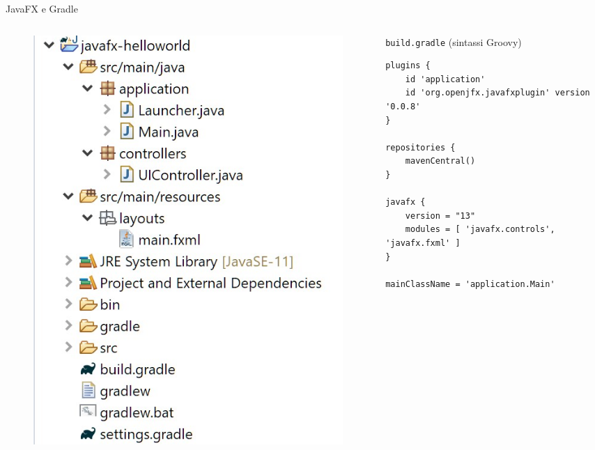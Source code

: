 \documentclass[presentation]{beamer}
\begin{document}
\begin{frame}[fragile]{JavaFX e Gradle}
\begin{columns}[t]
\begin{column}{0.3\textwidth}
\begin{figure}
\includegraphics[width=\textwidth]{img/javafx-gradle-project.png}
\end{figure}
\end{column}
\begin{column}{0.7\textwidth}
\begin{block}{\texttt{build.gradle} (sintassi Groovy)}

\begin{lstlisting}[basicstyle=\tiny]
plugins {
    id 'application'
    id 'org.openjfx.javafxplugin' version '0.0.8'
}

repositories {
    mavenCentral()
}

javafx {
    version = "13"
    modules = [ 'javafx.controls', 'javafx.fxml' ]
}

mainClassName = 'application.Main'
\end{lstlisting}

\end{block}
\end{column}
\end{columns}
\end{frame}
\end{document}
